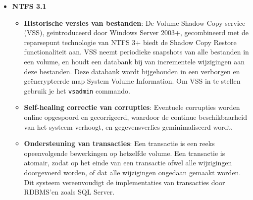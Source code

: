\begin{enumerate}
{\begin{itemize}
\begin{itemize}
						\item \textbf{Sparse bestanden}: Indien een bestand sparse is, kan NTFS enkel schijfruimte toewijzen aan de delen van grote bestanden waarnaar effectief wordt geschreven. Om een bestand als sparse te markeren, moet je het commando \texttt{fsutil sparse setflag \emph{bestandsnaam}} gebruiken. 
						\item \textbf{File markers voor Remote Storage Service}: 
						\item \textbf{Transparante encryptie en decodering}:  (\texttt{cipher /e /a /s:...})
						\item \textbf{Individuele diskquota op volumeniveau}: Voor elke gebruiker kan er een diskquota op volumeniveau ingesteld worden, zodat er een  maximale beschikbare opslagcapaciteit voor die gebruiker in een specifiek volume is. Om quotabeheer in te schakelen op een specifiek volume gebruik je het commando \texttt{fsutil quota enforce \emph{volumenaam}}. Om na te gaan of er gebruikers over de limiet zitten, gebruik je het commando \texttt{fsutil quota violations}. Informatie over het gebruik van volumes wordt geregistreerd per security ID en niet per accountnaam.
					\end{itemize}
				\item \textbf{NTFS 3.1}
					\begin{itemize}
						\item \textbf{Historische versies van bestanden}: De Volume Shadow Copy service (VSS), geïntroduceerd door Windows Server 2003+, gecombineerd met de reparsepunt technologie van NTFS 3+ biedt de Shadow Copy Restore functionaliteit aan. VSS neemt periodieke snapshots van alle bestanden in een volume, en houdt een databank bij van incrementele wijzigingen aan deze bestanden. Deze databank wordt bijgehouden in een verborgen en geëncrypteerde map System Volume Information. Om VSS in te stellen gebruik je het \texttt{vsadmin} commando.
						\item \textbf{Self-healing correctie van corrupties}: Eventuele corrupties worden online opgespoord en gecorrigeerd, waardoor de continue beschikbaarheid van het systeem verhoogt, en gegevensverlies geminimaliseerd wordt.
						\item \textbf{Ondersteuning van transacties}: Een transactie is een reeks opeenvolgende bewerkingen op hetzelfde volume. Een transactie is atomair, zodat op het einde van een transactie ofwel alle wijzigingen doorgevoerd worden, of dat alle wijzigingen ongedaan gemaakt worden. Dit systeem vereenvoudigt de implementaties van transacties door RDBMS'en zoals SQL Server. 

\end{itemize}
\end{itemize}}
\end{enumerate}
